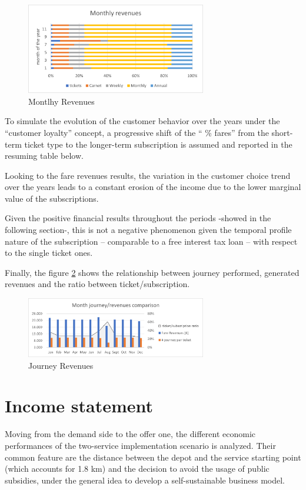 \begin{figure}[h]
    \centering
    \includegraphics[width=0.7\textwidth]{Images/financial/monthly_revenues.png}
    \caption{Montlhy Revenues}
    \label{fig:monthly_revenues}
\end{figure}
To simulate the evolution of the customer behavior over the years under the “customer loyalty” concept, a progressive shift of the “ \% fares” from the short-term ticket type to the longer-term subscription is assumed and reported in the resuming table below.

Looking to the fare revenues results, the variation in the customer choice trend over the years leads to a constant erosion of the income due to the lower marginal value of the subscriptions. 

Given the positive financial results throughout the periods -showed in the following section-, this is not a negative phenomenon given the temporal profile nature of the subscription – comparable to a free interest tax loan – with respect to the single ticket ones. 

Finally, the figure \ref{fig:j_revenues} shows the relationship between journey performed, generated revenues and the ratio between ticket/subscription.

\begin{figure}[h]
    \centering
    \includegraphics[width=0.7\textwidth]{Images/financial/journey_revenues.png}
    \caption{Journey Revenues}
    \label{fig:j_revenues}
\end{figure}

\section{Income statement}
Moving from the demand side to the offer one, the different economic performances of the two-service implementation scenario is analyzed. Their common feature are the distance between the depot and the service starting point (which accounts for 1.8 km) and the decision to avoid the usage of public subsidies, under the general idea to develop a self-sustainable business model.

